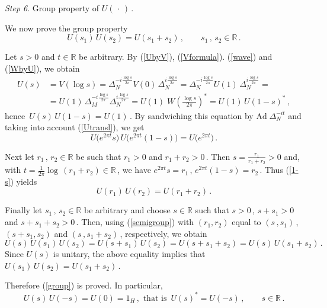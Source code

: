 \documentclass[reqno]{amsart}
\theoremstyle{definition}
\theoremstyle{remark}
\numberwithin{equation}{section}
\theoremstyle{plain}
\begin{document}
{\it Step 6}. {\sc Group property of $U(\,\cdot\, )\,$.}
\medskip

We now prove the group property
\begin{equation}\label{group}
U(s_1)\, U(s_2)=U(s_1+s_2)\, ,\qquad s_1\, ,\, s_2\in\mathbb R\, .
\end{equation}

Let $s>0$ and $t\in\mathbb R$ be arbitrary.
By (\ref{UbyV}), (\ref{Vformula}). (\ref{wave}) and (\ref{WbyU}),
we obtain
\begin{align*}
U(s) &=V( \log s)=\Delta_N^{\textstyle -i\frac {\log s}{2\pi}}
V(0)\,\Delta_N^{\textstyle i\frac {\log s}{2\pi}} =
\Delta_N^{\textstyle -i\frac {\log s}{2\pi}} U(1)\,
\Delta_N^{\textstyle i\frac {\log s}{2\pi}} = \\
&=U(1)\,\Delta_M^{\textstyle -i\frac {\log s}{2\pi}}
\Delta_N^{\textstyle i\frac {\log s}{2\pi}} =U(1)\; W\!\left(
\frac {\log s}{2\pi}\right)^{\! *} =U(1)\, U(1-s)^*\, ,
\end{align*}
hence $\, U(s)\, U(1-s) =U(1)\,$. By sandwiching this equation
by $\text{Ad}\; \Delta_N^{- i t}$ and taking into account
(\ref{Utransl}), we get
\begin{equation}\label{1-s}
U\big( e^{2 \pi t} s\big)\, U\big( e^{2 \pi t} (1-s)\big) =
U\big( e^{2 \pi t} \big)\, .
\end{equation}

Next let $r_1\, ,\, r_2\in\mathbb R$ be such that $r_1>0$ and
$r_1+r_2>0\,$. Then $\displaystyle s=\frac{r_1}{r_1+r_2}>0$ and,
with $\displaystyle t=\frac 1{2 \pi} \log\, (r_1+r_2)\in
\mathbb R\,$, we have $e^{2 \pi t} s=r_1\, ,\, e^{2 \pi t} (1-s)
=r_2\,$. Thus (\ref{1-s}) yields
\begin{equation}\label{semigroup}
U(r_1)\, U(r_2)=U(r_1+r_2)\, .
\end{equation}

Finally let $s_1\, ,\, s_2\in\mathbb R$ be arbitrary and choose
$s\in\mathbb R$ such that $s>0\,$, $s+s_1>0$ and $s+s_1+s_2>0\,$.
Then, using (\ref{semigroup}) with $(r_1 ,r_2)$ equal to
$(s\, ,s_1)\,$, $(s+s_1 ,s_2)$ and $(s\, ,s_1+s_2)\,$,
respectively, we obtain
\begin{equation*}
U(s)\, U(s_1)\, U(s_2) =U(s+s_1)\, U(s_2) =U(s+s_1+s_2) =
U(s)\, U(s_1+s_2)\, .
\end{equation*}
Since $U(s)$ is unitary, the above equality implies that
$U(s_1)\, U(s_2)=U(s_1+s_2)\,$.

Therefore (\ref{group}) is proved. In particular,
\begin{equation}\label{inverse}
U(s)\, U(-s)=U(0)=1_H\, ,\text{ that is }\, U(s)^*=U(-s)\, ,\qquad
s\in\mathbb R\, .
\end{equation}
\end{document}
